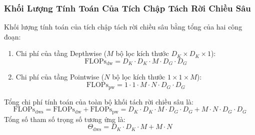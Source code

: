 \documentclass[12pt,a4paper]{report}
\begin{document}
\subsubsection{Khối Lượng Tính Toán Của Tích Chập Tách Rời Chiều Sâu}
Khối lượng tính toán của tích chập tách rời chiều sâu bằng tổng của hai công đoạn:
\begin{enumerate}
    \item Chi phí của tầng Depthwise ($M$ bộ lọc kích thước $D_K \times D_K \times 1$):
    \begin{equation}
        \text{FLOPs}_{\text{dw}} = D_K \cdot D_K \cdot M \cdot D_G \cdot D_G
    \end{equation}
    \item Chi phí của tầng Pointwise ($N$ bộ lọc kích thước $1 \times 1 \times M$):
    \begin{equation}
        \text{FLOPs}_{\text{pw}} = 1 \cdot 1 \cdot M \cdot N \cdot D_G \cdot D_G
    \end{equation}
\end{enumerate}
Tổng chi phí tính toán của toàn bộ khối tách rời chiều sâu là:
\begin{equation}
    \text{FLOPs}_{\text{dws}} = \text{FLOPs}_{\text{dw}} + \text{FLOPs}_{\text{pw}} = D_K \cdot D_K \cdot M \cdot D_G \cdot D_G + M \cdot N \cdot D_G \cdot D_G
\end{equation}
Tổng số tham số trọng số tương ứng là:
\begin{equation}
    \Theta_{\text{dws}} = D_K \cdot D_K \cdot M + M \cdot N
\end{equation}
\end{document}
